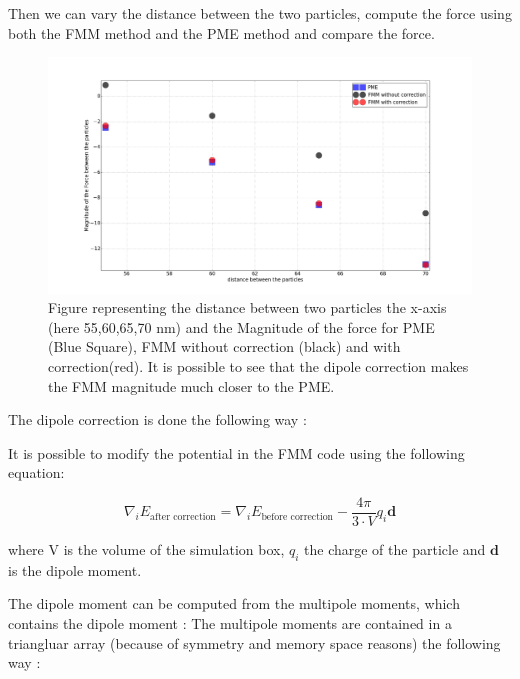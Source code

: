 \documentclass[11pt,twoside,a4paper]{report}
\begin{document}
	Then we can vary the distance between the two particles, compute the force using both the FMM method and the PME method and compare the force.	
	\begin{figure}[H]
	   \includegraphics[scale=0.2]{dipoleCorrection}
    \centering 
    \caption{Figure representing the distance between two particles the x-axis (here 55,60,65,70 nm) and the  Magnitude of the force for PME (Blue Square), FMM without correction (black) and with correction(red).
     It is possible to see that the dipole correction makes the FMM magnitude much closer to the PME.}    
   \end{figure}	
The dipole correction is done the following way :

It is possible to modify the potential in the FMM code using the following equation:

\begin{equation}
\label{eq:dipoleCorrection}
\nabla_iE_{\text{after correction}} = \nabla_iE_{\text{before correction}} - \frac{4\pi}{3 \cdot V} q_i \textbf{d}
\end{equation}	
	
	where V is the volume of the simulation box, $q_i$ the charge of the particle and $\textbf{d}$ is the dipole moment.

The dipole moment can be computed from the multipole moments, which contains the dipole moment : The multipole moments are contained in a triangluar array (because of symmetry and memory space reasons) the following way :
\end{document}

